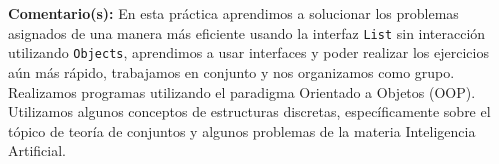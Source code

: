 \noindent\textbf{Comentario(s):} 
En esta práctica aprendimos a solucionar los problemas asignados de una manera más eficiente usando la interfaz \texttt{List} sin interacción utilizando \texttt{Objects}, aprendimos a usar interfaces y poder realizar los ejercicios aún más rápido, trabajamos en conjunto y nos organizamos como grupo. Realizamos programas utilizando el paradigma Orientado a Objetos (OOP). Utilizamos algunos conceptos de estructuras discretas, específicamente sobre el tópico de teoría de conjuntos y algunos problemas de la materia Inteligencia Artificial.